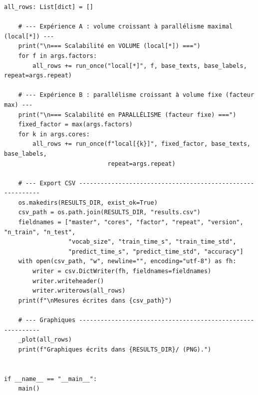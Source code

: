 \begin{lstlisting}[style=py]
    all_rows: List[dict] = []

    # --- Expérience A : volume croissant à parallélisme maximal (local[*]) ---
    print("\n=== Scalabilité en VOLUME (local[*]) ===")
    for f in args.factors:
        all_rows += run_once("local[*]", f, base_texts, base_labels, repeat=args.repeat)

    # --- Expérience B : parallélisme croissant à volume fixe (facteur max) ---
    print("\n=== Scalabilité en PARALLÉLISME (facteur fixe) ===")
    fixed_factor = max(args.factors)
    for k in args.cores:
        all_rows += run_once(f"local[{k}]", fixed_factor, base_texts, base_labels,
                             repeat=args.repeat)

    # --- Export CSV -----------------------------------------------------------
    os.makedirs(RESULTS_DIR, exist_ok=True)
    csv_path = os.path.join(RESULTS_DIR, "results.csv")
    fieldnames = ["master", "cores", "factor", "repeat", "version", "n_train", "n_test",
                  "vocab_size", "train_time_s", "train_time_std",
                  "predict_time_s", "predict_time_std", "accuracy"]
    with open(csv_path, "w", newline="", encoding="utf-8") as fh:
        writer = csv.DictWriter(fh, fieldnames=fieldnames)
        writer.writeheader()
        writer.writerows(all_rows)
    print(f"\nMesures écrites dans {csv_path}")

    # --- Graphiques -----------------------------------------------------------
    _plot(all_rows)
    print(f"Graphiques écrits dans {RESULTS_DIR}/ (PNG).")


if __name__ == "__main__":
    main()
\end{lstlisting}
